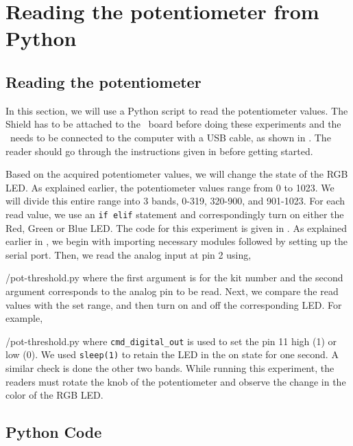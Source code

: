 \section{Reading the potentiometer from Python}
\subsection{Reading the potentiometer}
In this section, we will use a Python script to read the potentiometer
values. The Shield has to be attached to the \arduino\ board
before doing these experiments and the \arduino\ needs to be connected to the computer 
with a USB cable, as shown in .
The reader should go through the instructions given in
 before getting started.

Based on the acquired potentiometer values, we will change
the state of the RGB LED. As explained earlier, the potentiometer
values range from 0 to 1023. We will divide this entire range into 3
bands, 0-319, 320-900, and 901-1023. For each read value, we use an
{\tt if elif} statement and correspondingly turn on either the Red,
Green or Blue LED. The code for this experiment is given in
. As explained earlier in , we begin with 
importing necessary modules followed by setting up the serial port. 
Then, we read the analog input at pin 2 using,

                {\LocPotpycode/pot-threshold.py} where the first
                argument is for
the kit number and the second argument corresponds to the analog pin to be read.  
Next, we compare the read values with the set range, and then turn on and off the corresponding LED. For example, 

{\LocPotpycode/pot-threshold.py} where {\tt cmd\_digital\_out} 
is used to set the pin 11 high (1) or low (0). 
We used {\tt sleep(1)} to retain the LED in the on state for one second.  
A similar check is done the other two bands. 
While running this experiment, 
the readers must rotate the knob of the potentiometer and observe 
the change in the color of the RGB LED. 


\subsection{Python Code}
\label{sec:pot-python-code}
\begin{pycode}
\label{py:pot-100}

\end{pycode}

